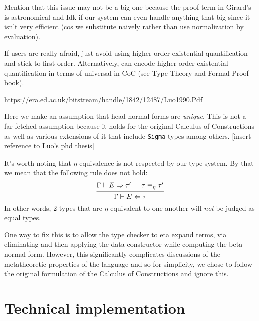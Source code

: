 \documentclass{article}
\begin{document}
Mention that this issue may not be a big one because the proof term in Girard's
is astronomical and Idk if our system can even handle anything that big since it
isn't very efficient (cos we substitute naively rather than use normalization
by evaluation).

If users are really afraid, just avoid using higher order existential
quantification and stick to first order. Alternatively, can encode higher order
existential quantification in terms of universal in CoC (see Type Theory and
Formal Proof book).

https://era.ed.ac.uk/bitstream/handle/1842/12487/Luo1990.Pdf



Here we make an assumption that head normal forms are \textit{unique}. 
This is not a far fetched assumption because it holds for the original Calculus
of Constructions as well as various extensions of it that include \verb|Sigma|
types among others. [insert reference to Luo's phd thesis]



It's worth noting that $\eta$ equivalence is not respected by our type system.
By that we mean that the following rule does not hold:
\[
  \begin{prooftree}
    \hypo{\Gamma \vdash E \Rightarrow \tau'}
    \hypo{\tau \equiv_{\eta} \tau'}
    \infer2{\Gamma \vdash E \Leftarrow \tau}
 \end{prooftree}
\]
In other words, 2 types that are $\eta$ equivalent to one another will 
\textit{not} be judged as equal types.

One way to fix this is to allow the type checker to eta expand terms, via
eliminating and then applying the data constructor while computing the beta
normal form. However, this significantly complicates discussions of the
metatheoretic properties of the language and so for simplicity, we chose to
follow the original formulation of the Calculus of Constructions and ignore
this.


\section{Technical implementation}
\end{document}
